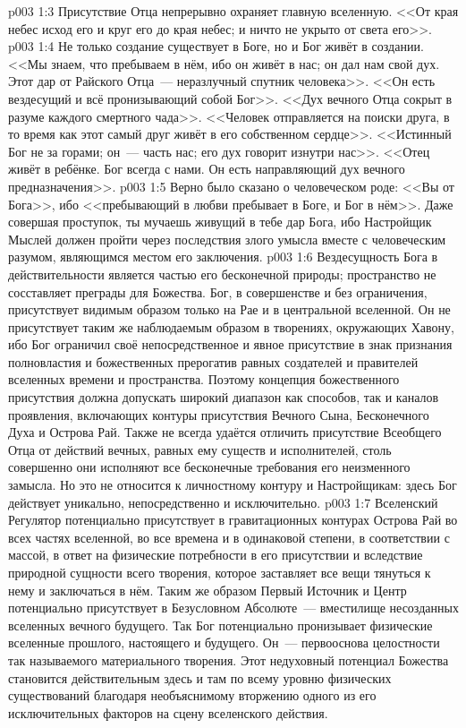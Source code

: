 \vs p003 1:3 Присутствие Отца непрерывно охраняет главную вселенную. <<От края небес исход его и круг его до края небес; и ничто не укрыто от света его>>.
\vs p003 1:4 \pc Не только создание существует в Боге, но и Бог живёт в создании. <<Мы знаем, что пребываем в нём, ибо он живёт в нас; он дал нам свой дух. Этот дар от Райского Отца~--- неразлучный спутник человека>>. <<Он есть вездесущий и всё пронизывающий собой Бог>>. <<Дух вечного Отца сокрыт в разуме каждого смертного чада>>. <<Человек отправляется на поиски друга, в то время как этот самый друг живёт в его собственном сердце>>. <<Истинный Бог не за горами; он~--- часть нас; его дух говорит изнутри нас>>. <<Отец живёт в ребёнке. Бог всегда с нами. Он есть направляющий дух вечного предназначения>>.
\vs p003 1:5 Верно было сказано о человеческом роде: <<Вы от Бога>>, ибо <<пребывающий в любви пребывает в Боге, и Бог в нём>>. Даже совершая проступок, ты мучаешь живущий в тебе дар Бога, ибо Настройщик Мыслей должен пройти через последствия злого умысла вместе с человеческим разумом, являющимся местом его заключения.
\vs p003 1:6 \pc Вездесущность Бога в действительности является частью его бесконечной природы; пространство не сосставляет преграды для Божества. Бог, в совершенстве и без ограничения, присутствует видимым образом только на Рае и в центральной вселенной. Он не присутствует таким же наблюдаемым образом в творениях, окружающих Хавону, ибо Бог ограничил своё непосредственное и явное присутствие в знак признания полновластия и божественных прерогатив равных создателей и правителей вселенных времени и пространства. Поэтому концепция божественного присутствия должна допускать широкий диапазон как способов, так и каналов проявления, включающих контуры присутствия Вечного Сына, Бесконечного Духа и Острова Рай. Также не всегда удаётся отличить присутствие Всеобщего Отца от действий вечных, равных ему существ и исполнителей, столь совершенно они исполняют все бесконечные требования его неизменного замысла. Но это не относится к личностному контуру и Настройщикам: здесь Бог действует уникально, непосредственно и исключительно.
\vs p003 1:7 \pc Вселенский Регулятор потенциально присутствует в гравитационных контурах Острова Рай во всех частях вселенной, во все времена и в одинаковой степени, в соответствии с массой, в ответ на физические потребности в его присутствии и вследствие природной сущности всего творения, которое заставляет все вещи тянуться к нему и заключаться в нём. Таким же образом Первый Источник и Центр потенциально присутствует в Безусловном Абсолюте~--- вместилище несозданных вселенных вечного будущего. Так Бог потенциально пронизывает физические вселенные прошлого, настоящего и будущего. Он~--- первооснова целостности так называемого материального творения. Этот недуховный потенциал Божества становится действительным здесь и там по всему уровню физических существований благодаря необъяснимому вторжению одного из его исключительных факторов на сцену вселенского действия.
